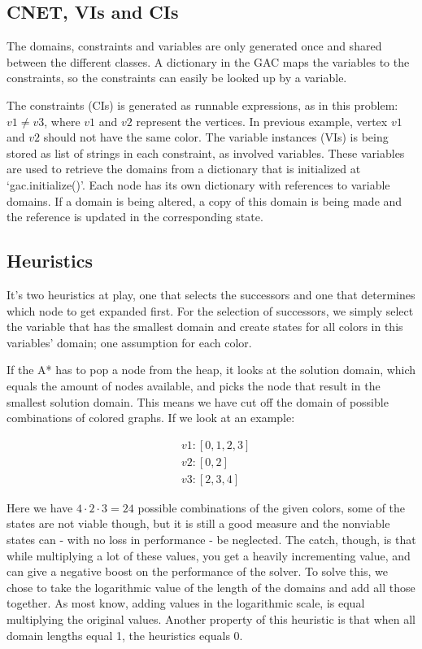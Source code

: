 

\subsection{CNET, VIs and CIs}
The domains, constraints and variables are only generated once and shared between the different classes. A dictionary in the GAC maps the variables to the constraints, so the constraints can easily be looked up by a variable.

The constraints (CIs) is generated as runnable expressions, as in this problem: \( v1 \neq v3 \), where \(v1\) and \(v2\) represent the vertices. In previous example, vertex \(v1\) and \(v2\) should not have the same color. The variable instances (VIs) is being stored as list of strings in each constraint, as involved variables. These variables are used to retrieve the domains from a dictionary that is initialized at `gac.initialize()'. Each node has its own dictionary with references to variable domains. If a domain is being altered, a copy of this domain is being made and the reference is updated in the corresponding state.

\subsection*{Heuristics}
It's two heuristics at play, one that selects the successors and one that determines which node to get expanded first. For the selection of successors, we simply select the variable that has the smallest domain and create states for all colors in this variables' domain; one assumption for each color.

If the A* has to pop a node from the heap, it looks at the solution domain, which equals the amount of nodes available, and picks the node that result in the smallest solution domain. This means we have cut off the domain of possible combinations of colored graphs. If we look at an example:

\begin{align*}
	&v1: [0,1,2,3]\\
	&v2: [0,2]\\
	&v3: [2,3,4]
\end{align*}

Here we have \(4 \cdot 2 \cdot 3 = 24\) possible combinations of the given colors, some of the states are not viable though, but it is still a good measure and the nonviable states can - with no loss in performance - be neglected. The catch, though, is that while multiplying a lot of these values, you get a heavily incrementing value, and can give a negative boost on the performance of the solver. To solve this, we chose to take the logarithmic value of the length of the domains and add all those together. As most know, adding values in the logarithmic scale, is equal multiplying the original values. Another property of this heuristic is that when all domain lengths equal 1, the heuristics equals 0.

